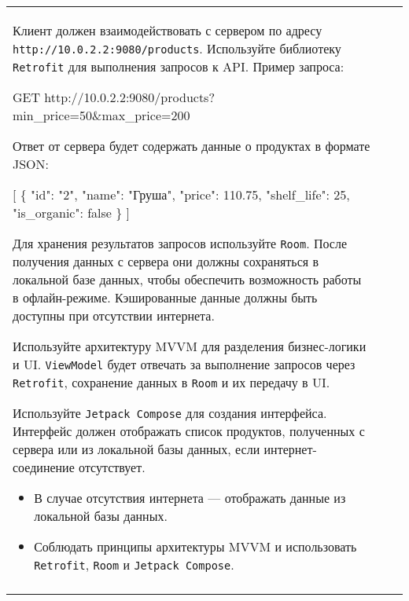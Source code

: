 \documentclass[a4paper]{article}
\begin{document}
\begin{tabular}{!{\vrule width 2pt}p{5cm}|p{6cm}|p{4cm}!{\vrule width 2pt}}
{\begin{minipage}{16cm}
\begin{enumerate}
Клиент должен взаимодействовать с сервером по адресу \texttt{http://10.0.2.2:9080/products}. Используйте библиотеку \texttt{Retrofit} для выполнения запросов к API. Пример запроса:


GET http://10.0.2.2:9080/products?
min\_price=50\&max\_price=200


Ответ от сервера будет содержать данные о продуктах в формате JSON:


[
  \{
    "id": "2",
    "name": "Груша",
    "price": 110.75,
    "shelf\_life": 25,
    "is\_organic": false
  \}
]


Для хранения результатов запросов используйте \texttt{Room}. После получения данных с сервера они должны сохраняться в локальной базе данных, чтобы обеспечить возможность работы в офлайн-режиме. Кэшированные данные должны быть доступны при отсутствии интернета.

Используйте архитектуру MVVM для разделения бизнес-логики и UI. \texttt{ViewModel} будет отвечать за выполнение запросов через \texttt{Retrofit}, сохранение данных в \texttt{Room} и их передачу в UI.

Используйте \texttt{Jetpack Compose} для создания интерфейса. Интерфейс должен отображать список продуктов, полученных с сервера или из локальной базы данных, если интернет-соединение отсутствует.

\begin{itemize}
  \item В случае отсутствия интернета — отображать данные из локальной базы данных.
  \item Соблюдать принципы архитектуры MVVM и использовать \texttt{Retrofit}, \texttt{Room} и \texttt{Jetpack Compose}.
\end{itemize} 
\end{enumerate}

\vspace{0.2cm}
    
\end{minipage}
}
\\
\end{tabular}
\end{document}
